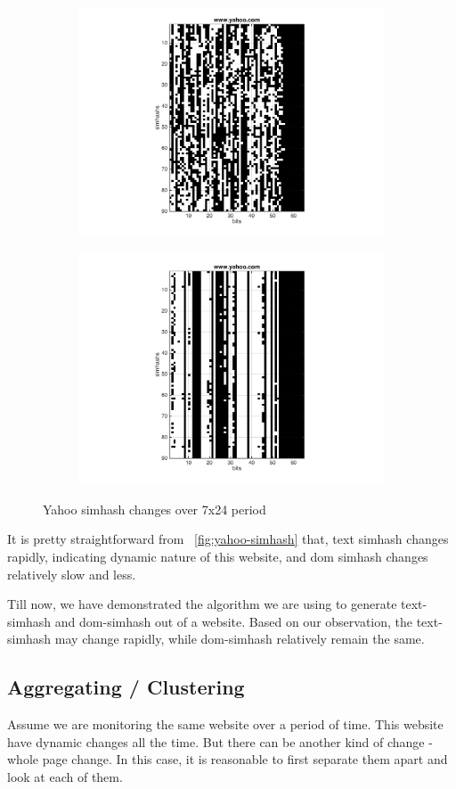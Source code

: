 \begin{figure}[t]
  \centering
  \begin{subfigure}
    \centering
    \includegraphics[width=.5\textwidth]{fig/yahoo-text}
    \label{fig:yahoo-text}
  \end{subfigure}%
  \begin{subfigure}
    \centering
    \includegraphics[width=.5\textwidth]{fig/yahoo-dom}
    \label{fig:yahoo-dom}
  \end{subfigure}
  \caption{Yahoo simhash changes over 7x24 period}
  \label{fig:yahoo-simhash}
\end{figure}

It is pretty straightforward from ~\autoref{fig:yahoo-simhash} that,
text simhash changes rapidly, indicating dynamic nature of this
website, and dom simhash changes relatively slow and less.

Till now, we have demonstrated the algorithm we are using to generate
text-simhash and dom-simhash out of a website. Based on our observation, the
text-simhash may change rapidly, while dom-simhash relatively remain the same.


\subsection{Aggregating / Clustering}
Assume we are monitoring the same website over a period of time. This website
have dynamic changes all the time. But there can be another kind of change -
whole page change. In this case, it is reasonable to first separate them apart
and look at each of them.


